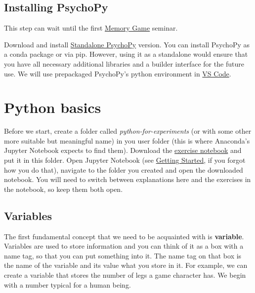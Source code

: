 \documentclass[
]{book}
\begin{document}
\hypertarget{install-psychopy}{%
\section*{Installing PsychoPy}\label{install-psychopy}}

This step can wait until the first \protect\hyperlink{memory-game-01}{Memory Game} seminar.

Download and install \href{https://www.psychopy.org/download.html}{Standalone PsychoPy} version. You can install PsychoPy as a conda package or via pip. However, using it as a standalone would ensure that you have all necessary additional libraries and a builder interface for the future use. We will use prepackaged PsychoPy's python environment in \protect\hyperlink{install-vs-code}{VS Code}.

\hypertarget{seminar01}{%
\chapter{Python basics}\label{seminar01}}

Before we start, create a folder called \emph{python-for-experiments} (or with some other more suitable but meaningful name) in you user folder (this is where Anaconda's Jupyter Notebook expects to find them). Download the \href{notebooks/Seminar\%2001.\%20Basics.ipynb}{exercise notebook} and put it in this folder. Open Jupyter Notebook (see \protect\hyperlink{getting-started}{Getting Started}, if you forgot how you do that), navigate to the folder you created and open the downloaded notebook. You will need to switch between explanations here and the exercises in the notebook, so keep them both open.

\hypertarget{variables}{%
\section{Variables}\label{variables}}

The first fundamental concept that we need to be acquainted with is \textbf{variable}. Variables are used to store information and you can think of it as a box with a name tag, so that you can put something into it. The name tag on that box is the name of the variable and its value what you store in it. For example, we can create a variable that stores the number of legs a game character has. We begin with a number typical for a human being.
\end{document}
